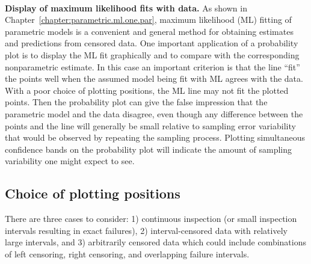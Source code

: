 \mbox{ }\\
\noindent
{\bf Display of maximum likelihood fits with data.}
As shown in 
Chapter~\ref{chapter:parametric.ml.one.par},
maximum likelihood (ML) fitting of parametric models
is a convenient and general method for obtaining
estimates and predictions from censored data.  One important
application of a probability plot is to display the ML
fit graphically and to compare with the corresponding nonparametric
estimate.  In this case an important criterion is that the line
``fit'' the points well when the assumed model being fit
with ML agrees with the data. 
With a poor choice of plotting positions, the ML line may not 
fit the plotted points. Then the probability plot can give
the false impression that the parametric model and the data disagree,
even though any difference
between the points and the line will generally be small relative to
sampling error 
variability that would be observed by repeating the sampling process.
Plotting simultaneous confidence bands on the
probability plot will indicate the amount of sampling variability
one might expect to see.

\subsection{Choice of plotting positions}
There are three cases to consider: 1) continuous inspection 
(or small inspection intervals resulting in exact failures), 
2) interval-censored data
with relatively large intervals, and 3) arbitrarily censored data which
could include combinations of left censoring, right censoring,
and overlapping failure intervals.



